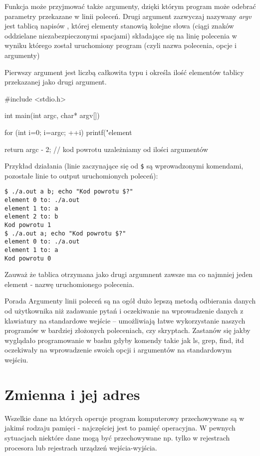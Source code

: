 \documentclass{pdfBooklets}
\begin{document}
Funkcja  może przyjmować także argumenty, dzięki którym program może odebrać parametry przekazane w linii poleceń.
Drugi argument zazwyczaj nazywany \textit{argv} jest tablicą napisów ,
	której elementy stanowią kolejne słowa (ciągi znaków oddzielane niezabezpieczonymi spacjami) składające się na linię polecenia w wyniku którego został uruchomiony program (czyli nazwa polecenia, opcje i argumenty)

Pierwszy argument jest liczbą całkowita typu  i określa ilość elementów tablicy przekazanej jako drugi argument.

\begin{CodeFrame*}[c]{}
#include <stdio.h>

int main(int argc, char* argv[]) {
	for (int i=0; i=argc; ++i)
		printf("element %
	
	return argc - 2; // kod powrotu uzależniamy od ilości argumentów
}
\end{CodeFrame*}

Przykład działania (linie zaczynające się od \Verb#$# są wprowadzonymi komendami, pozostałe linie to output uruchomionych poleceń):
\begin{Verbatim}
$ ./a.out a b; echo "Kod powrotu $?"
element 0 to: ./a.out
element 1 to: a
element 2 to: b
Kod powrotu 1
$ ./a.out a; echo "Kod powrotu $?"
element 0 to: ./a.out
element 1 to: a
Kod powrotu 0
\end{Verbatim}

Zauważ że tablica otrzymana jako drugi argumnent zawsze ma co najmniej jeden element - nazwę uruchomionego polecenia.

\begin{ProTip}{Porada}
Argumenty linii poleceń są na ogół dużo lepszą metodą odbierania danych od użytkownika niż zadawanie pytań i oczekiwanie na wprowadzenie danych z klawiatury na standardowe wejście – umożliwiają łatwe wykorzystanie naszych programów w bardziej złożonych poleceniach, czy skryptach. Zastanów się jakby wyglądało programowanie w bashu gdyby komendy takie jak ls, grep, find, itd oczekiwały na wprowadzenie swoich opcji i argumentów na standardowym wejściu.
\end{ProTip}

\section{Zmienna i jej adres}

Wszelkie dane na których operuje program komputerowy przechowywane są w jakimś rodzaju pamięci - najczęściej jest to pamięć operacyjna. W pewnych sytuacjach niektóre dane mogą być przechowywane np. tylko w rejestrach procesora lub rejestrach urządzeń wejścia-wyjścia.
\end{document}
